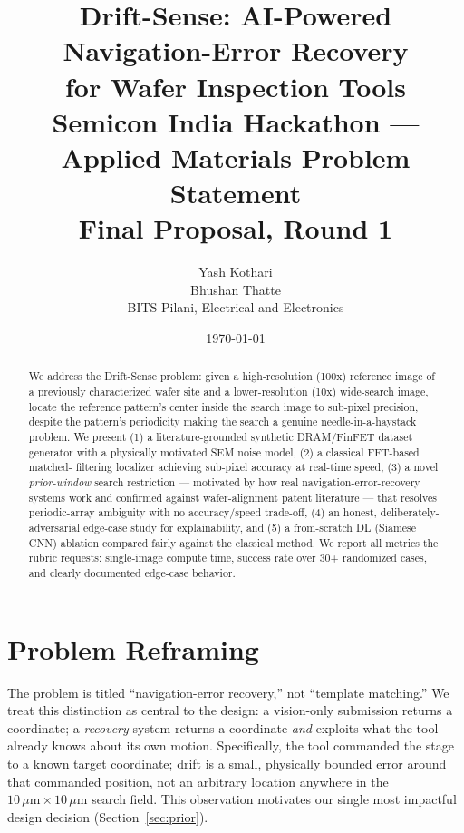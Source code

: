 \documentclass[11pt]{article}
\title{\textbf{Drift-Sense: AI-Powered Navigation-Error Recovery\\ for Wafer Inspection Tools}\\
\large Semicon India Hackathon --- Applied Materials Problem Statement\\
\large Final Proposal, Round 1}
\author{Yash Kothari \\ Bhushan Thatte \\ BITS Pilani, Electrical and Electronics}
\date{\today}
\begin{document}
\maketitle

\begin{abstract}
We address the Drift-Sense problem: given a high-resolution (100x) reference
image of a previously characterized wafer site and a lower-resolution (10x)
wide-search image, locate the reference pattern's center inside the search
image to sub-pixel precision, despite the pattern's periodicity making the
search a genuine needle-in-a-haystack problem. We present (1) a
literature-grounded synthetic DRAM/FinFET dataset generator with a
physically motivated SEM noise model, (2) a classical FFT-based matched-
filtering localizer achieving sub-pixel accuracy at real-time speed, (3) a
novel \emph{prior-window} search restriction --- motivated by how real
navigation-error-recovery systems work and confirmed against wafer-alignment
patent literature --- that resolves periodic-array ambiguity with no
accuracy/speed trade-off, (4) an honest, deliberately-adversarial edge-case
study for explainability, and (5) a from-scratch DL (Siamese CNN) ablation
compared fairly against the classical method. We report all metrics the
rubric requests: single-image compute time, success rate over 30+
randomized cases, and clearly documented edge-case behavior.
\end{abstract}

\tableofcontents
\newpage

\section{Problem Reframing}

The problem is titled ``navigation-error recovery,'' not ``template
matching.'' We treat this distinction as central to the design: a
vision-only submission returns a coordinate; a \emph{recovery} system
returns a coordinate \emph{and} exploits what the tool already knows about
its own motion. Specifically, the tool commanded the stage to a known
target coordinate; drift is a small, physically bounded error around that
commanded position, not an arbitrary location anywhere in the $10\,\mu
\text{m} \times 10\,\mu\text{m}$ search field. This observation motivates
our single most impactful design decision (Section~\ref{sec:prior}).
\end{document}
